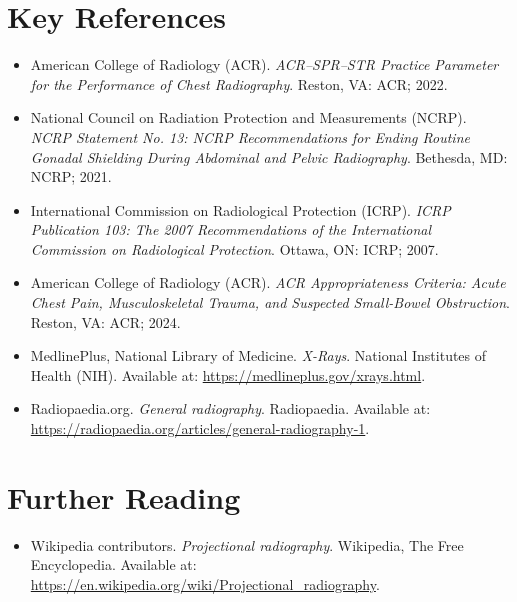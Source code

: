 \section{Key References}

\begin{itemize}
    \item American College of Radiology (ACR). \textit{ACR--SPR--STR Practice Parameter for the Performance of Chest Radiography}. Reston, VA: ACR; 2022.
    \item National Council on Radiation Protection and Measurements (NCRP). \textit{NCRP Statement No. 13: NCRP Recommendations for Ending Routine Gonadal Shielding During Abdominal and Pelvic Radiography}. Bethesda, MD: NCRP; 2021.
    \item International Commission on Radiological Protection (ICRP). \textit{ICRP Publication 103: The 2007 Recommendations of the International Commission on Radiological Protection}. Ottawa, ON: ICRP; 2007.
    \item American College of Radiology (ACR). \textit{ACR Appropriateness Criteria: Acute Chest Pain, Musculoskeletal Trauma, and Suspected Small-Bowel Obstruction}. Reston, VA: ACR; 2024.
    \item MedlinePlus, National Library of Medicine. \textit{X-Rays}. National Institutes of Health (NIH). Available at: \url{https://medlineplus.gov/xrays.html}.
    \item Radiopaedia.org. \textit{General radiography}. Radiopaedia. Available at: \url{https://radiopaedia.org/articles/general-radiography-1}.
\end{itemize}

\section{Further Reading}
\begin{itemize}
  \item Wikipedia contributors. \textit{Projectional radiography}. Wikipedia, The Free Encyclopedia. Available at: \url{https://en.wikipedia.org/wiki/Projectional_radiography}.
\end{itemize}
